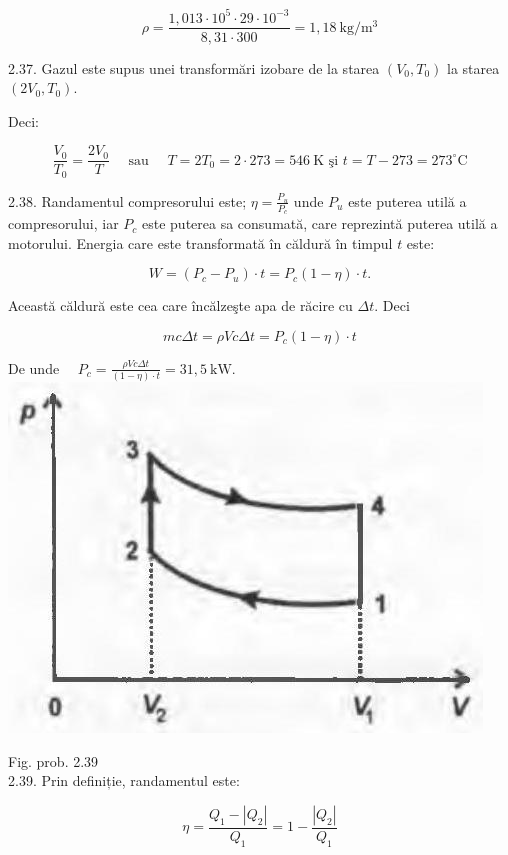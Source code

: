 \documentclass[10pt]{article}
\begin{document}
$$
\rho=\frac{1,013 \cdot 10^{5} \cdot 29 \cdot 10^{-3}}{8,31 \cdot 300}=1,18 \mathrm{~kg} / \mathrm{m}^{3}
$$

2.37. Gazul este supus unei transformări izobare de la starea $\left(V_{0}, T_{0}\right)$ la starea $\left(2 V_{0}, T_{0}\right)$.

Deci:

$$
\frac{V_{0}}{T_{0}}=\frac{2 V_{0}}{T} \quad \text { sau } \quad T=2 T_{0}=2 \cdot 273=546 \mathrm{~K} \text { şi } t=T-273=273^{\circ} \mathrm{C}
$$

2.38. Randamentul compresorului este; $\eta=\frac{P_{u}}{P_{c}}$ unde $P_{u}$ este puterea utilă a compresorului, iar $P_{c}$ este puterea sa consumată, care reprezintă puterea utilă a motorului. Energia care este transformată în căldură în timpul $t$ este:

$$
W=\left(P_{c}-P_{u}\right) \cdot t=P_{c}(1-\eta) \cdot t .
$$

Această căldură este cea care încălzeşte apa de răcire cu $\Delta t$. Deci

$$
m c \Delta t=\rho V c \Delta t=P_{c}(1-\eta) \cdot t
$$

De unde $\quad P_{c}=\frac{\rho V c \Delta t}{(1-\eta) \cdot t}=31,5 \mathrm{~kW}$.\\
\includegraphics[max width=\textwidth, center]{2025_07_01_5b3ff9fa0d508c8e9f17g-276}

Fig. prob. 2.39\\
2.39. Prin definiție, randamentul este:


\begin{equation*}
\eta=\frac{Q_{1}-\left|Q_{2}\right|}{Q_{1}}=1-\frac{\left|Q_{2}\right|}{Q_{1}} \tag{1}
\end{equation*}
\end{document}
